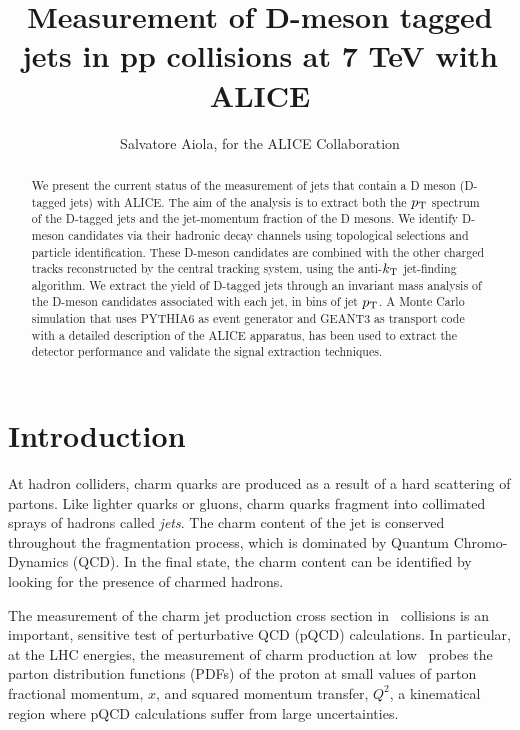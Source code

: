 \documentclass[a4paper]{jpconf}
\begin{document}
\title{Measurement of D-meson tagged jets in pp collisions at 7 TeV with ALICE}

\author{Salvatore Aiola, for the ALICE Collaboration}

\address{Physics Department, Yale University, 266 Whitney Avenue, New Haven, CT 06511}


\begin{abstract}
We present the current status of the measurement of jets that contain a D meson (D-tagged jets) with \mbox{ALICE}.
The aim of the analysis is to extract both the $p_{\rm T}$ spectrum of the D-tagged jets and the jet-momentum fraction of the D mesons. 
We identify D-meson candidates via their hadronic decay channels using topological selections and particle identification.
These D-meson candidates are combined with the other charged tracks reconstructed by the central tracking system, 
using the anti-$k_{\rm T}$ jet-finding algorithm.
We extract the yield of D-tagged jets through an invariant mass analysis of the D-meson candidates associated with each jet, 
in bins of jet $p_{\rm T}$.
A Monte Carlo simulation that uses PYTHIA6 as event generator and GEANT3 as transport code with a detailed description of the ALICE apparatus,
has been used to extract the detector performance and validate the signal extraction techniques.
\end{abstract}

\section{Introduction}
At hadron colliders, charm quarks are produced as a result of a hard scattering of partons. Like lighter quarks or gluons, charm quarks
fragment into collimated sprays of hadrons called \emph{jets}. The charm content of the jet is conserved throughout the fragmentation process,
which is dominated by Quantum Chromo-Dynamics (QCD).
In the final state, the charm content can be identified by looking for the presence of charmed hadrons.

The measurement of the charm jet production cross section in \pp\ collisions is an important, sensitive test of perturbative QCD (pQCD) calculations.
In particular, at the LHC energies, the measurement of charm production at low \pT\ probes the parton distribution functions (PDFs)
of the proton at small values of parton fractional momentum, $x$, and squared momentum transfer, $Q^2$, 
a kinematical region where pQCD calculations suffer from large uncertainties.
\end{document}
